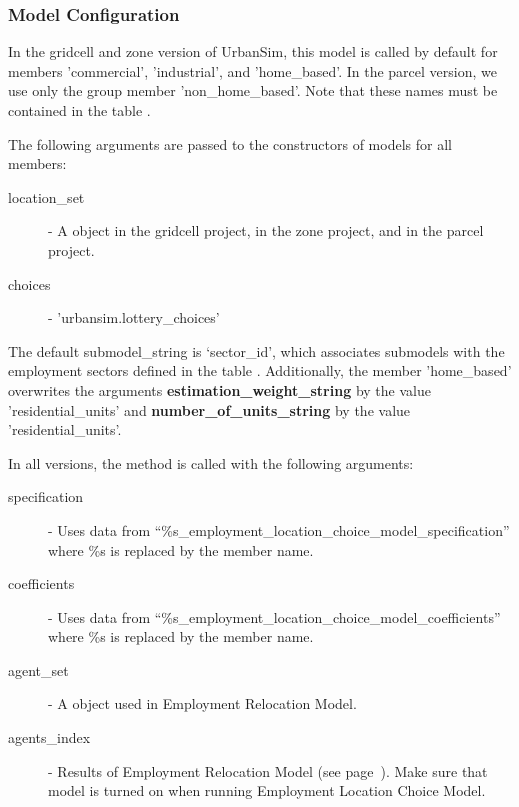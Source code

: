 \subsubsection{Model Configuration}
%
In the gridcell and zone version of UrbanSim, this model is called by default for members 'commercial', 
'industrial', and 'home_based'.
In the parcel version, we use only the group member 'non_home_based'. Note that 
these names must be contained in the table . 

The following arguments are passed to the constructors of models for all members:
\begin{description}
\item[location_set] - A  object in the gridcell project,  in the zone project,
  and  in the parcel project.
\item[choices] - 'urbansim.lottery_choices'
\end{description}
The default submodel_string is `sector_id', which associates submodels with the employment sectors defined in the table .  
Additionally, the member 'home_based' overwrites the arguments {\bf estimation_weight_string} by the value 'residential_units' 
and {\bf number_of_units_string} by the value 'residential_units'.

In all versions, the  method is called with the following arguments:
\begin{description}
\item[specification] - Uses data from
  ``\%s_employment_location_choice_model_specification'' where \%s is replaced by the member name.
\item[coefficients] \coefficientsindex - Uses data from ``\%s_employment_location_choice_model_coefficients'' 
    where \%s is replaced by the member name.
\item[agent_set] - A  object used in Employment Relocation Model.
\item[agents_index] - Results of Employment Relocation Model (see page~\pageref{page:ERM}). 
Make sure that model is turned on 
when running Employment Location Choice Model.
\end{description}
 
%
